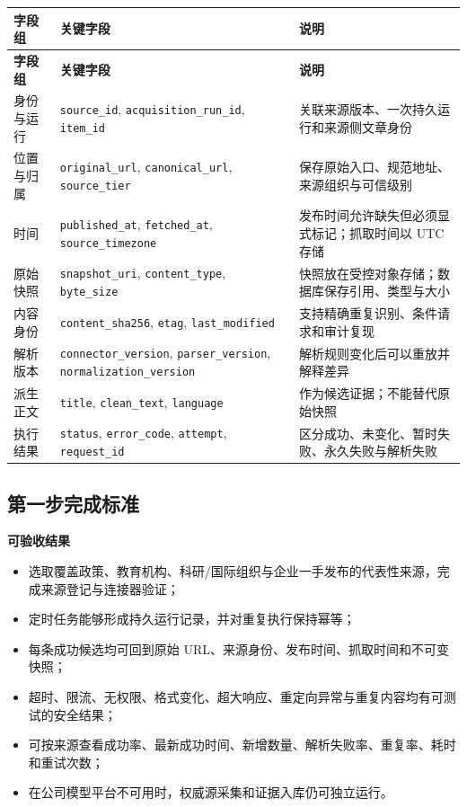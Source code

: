 \documentclass[UTF8,11pt,a4paper,fontset=none]{ctexart}
\begin{document}
\begin{longtable}{L{3.05cm}L{4.15cm}L{8.15cm}}
\toprule
{}
\color{white}\bfseries\sffamily 字段组 &
\color{white}\bfseries\sffamily 关键字段 &
\color{white}\bfseries\sffamily 说明 \\
\midrule
\endfirsthead
\toprule
{}
\color{white}\bfseries\sffamily 字段组 &
\color{white}\bfseries\sffamily 关键字段 &
\color{white}\bfseries\sffamily 说明 \\
\midrule
\endhead
身份与运行 & \texttt{source\_id}, \texttt{acquisition\_run\_id}, \texttt{item\_id} & 关联来源版本、一次持久运行和来源侧文章身份 \\
位置与归属 & \texttt{original\_url}, \texttt{canonical\_url}, \texttt{source\_tier} & 保存原始入口、规范地址、来源组织与可信级别 \\
时间 & \texttt{published\_at}, \texttt{fetched\_at}, \texttt{source\_timezone} & 发布时间允许缺失但必须显式标记；抓取时间以 UTC 存储 \\
原始快照 & \texttt{snapshot\_uri}, \texttt{content\_type}, \texttt{byte\_size} & 快照放在受控对象存储；数据库保存引用、类型与大小 \\
内容身份 & \texttt{content\_sha256}, \texttt{etag}, \texttt{last\_modified} & 支持精确重复识别、条件请求和审计复现 \\
解析版本 & \texttt{connector\_version}, \texttt{parser\_version}, \texttt{normalization\_version} & 解析规则变化后可以重放并解释差异 \\
派生正文 & \texttt{title}, \texttt{clean\_text}, \texttt{language} & 作为候选证据；不能替代原始快照 \\
执行结果 & \texttt{status}, \texttt{error\_code}, \texttt{attempt}, \texttt{request\_id} & 区分成功、未变化、暂时失败、永久失败与解析失败 \\
\bottomrule
\end{longtable}

\subsection{第一步完成标准}

\begin{focusbox}
\textbf{\sffamily\color{navy}可验收结果}\par
\begin{itemize}[leftmargin=1.7em,itemsep=0.2em,topsep=0.35em]
  \item 选取覆盖政策、教育机构、科研/国际组织与企业一手发布的代表性来源，完成来源登记与连接器验证；
  \item 定时任务能够形成持久运行记录，并对重复执行保持幂等；
  \item 每条成功候选均可回到原始 URL、来源身份、发布时间、抓取时间和不可变快照；
  \item 超时、限流、无权限、格式变化、超大响应、重定向异常与重复内容均有可测试的安全结果；
  \item 可按来源查看成功率、最新成功时间、新增数量、解析失败率、重复率、耗时和重试次数；
  \item 在公司模型平台不可用时，权威源采集和证据入库仍可独立运行。
\end{itemize}
\end{focusbox}
\end{document}
